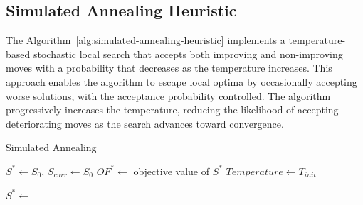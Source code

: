 \subsection{Simulated Annealing Heuristic}

The Algorithm~\ref{alg:simulated-annealing-heuristic} implements a temperature-based stochastic local search that accepts both improving and non-improving moves with a probability that decreases as the temperature increases. This approach enables the algorithm to escape local optima by occasionally accepting worse solutions, with the acceptance probability controlled. The algorithm progressively increases the temperature, reducing the likelihood of accepting deteriorating moves as the search advances toward convergence.

\begin{algorithm}[h!]
	\caption{Simulated Annealing} \label{alg:simulated-annealing-heuristic}
	\SetAlgoLined

	$S^* \leftarrow S_0$, $S_{curr} \leftarrow S_0$\;
	$OF^* \leftarrow$ objective value of $S^*$\;
	$Temperature \leftarrow T_{init}$\;

	$S^* \leftarrow$ \;
	\;
\end{algorithm}

